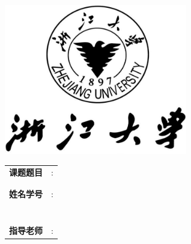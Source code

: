 \documentclass{ctexart}
\numberwithin{figure}{section}
\numberwithin{table}{section}
\begin{document}
	
	
	
	\thispagestyle{empty}
	\begin{center}
		\includegraphics[width=0.6\textwidth]{logo.png}
	\end{center}
	\vspace{1.8cm}
	
	\graphicspath{{figures/}}
	\begin{center}
		\begin{tabular}{rl}
			\textbf{课题题目} & : \underline{\makebox[8cm]{xxxxxxx}} \\
			& \; \underline{\makebox[8cm]{（xxxxxxx）}} \\
			\vspace{0.1cm} & \\
			\textbf{姓名学号} & : \underline{\makebox[8cm]{xx\quad xxx}} \\
			\vspace{0.1cm} & \\
			&\;  \underline{\makebox[8cm]{xx\quad xxx}}\\
			\vspace{0.1cm} & \\
			&\;  \underline{\makebox[8cm]{xx\quad xxx}} \\
			\vspace{0.1cm} & \\
			&\;  \underline{\makebox[8cm]{xx \quad xxx}} \\
			\vspace{0.1cm} & \\
			\textbf{指导老师} & : \underline{\makebox[8cm]{xxx}} \\
		\end{tabular}
	\end{center}
	
\end{document}
